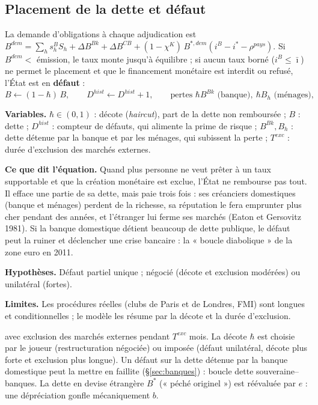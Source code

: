 \documentclass[11pt,a4paper]{article}
\newcommand{\og}{« }
\newcommand{\fg}{ »}
\newcommand{\variables}{\par\noindent\textbf{Variables.} }
\newcommand{\sens}{\par\noindent\textbf{Ce que dit l'équation.} }
\newcommand{\hyp}{\par\noindent\textbf{Hypothèses.} }
\newcommand{\limites}{\par\noindent\textbf{Limites.} }
\begin{document}
\subsection{Placement de la dette et défaut}
La demande d'obligations à chaque adjudication est $B^{dem} = \sum_h s^B_h S_h + \Delta B^{Bk} + \Delta B^{CB} + (1-\chi^K)\,B^{\ast,dem}(i^B - i^\ast - \rho^{pays})$. Si $B^{dem} < $ émission, le taux monte jusqu'à équilibre ; si aucun taux borné ($i^B \le \bar\imath$) ne permet le placement et que le financement monétaire est interdit ou refusé, l'État est en \textbf{défaut} :
\begin{equation}
B \leftarrow (1-\hbar)\,B, \qquad D^{hist} \leftarrow D^{hist} + 1, \qquad \text{pertes } \hbar B^{Bk} \text{ (banque)}, \ \hbar B_h \text{ (ménages)},
\label{eq:default}
\end{equation}
\begin{lecture}
\variables $\hbar\in(0,1)$ : décote (\emph{haircut}), part de la dette non remboursée ; $B$ : dette ; $D^{hist}$ : compteur de défauts, qui alimente la prime de risque ; $B^{Bk}, B_h$ : dette détenue par la banque et par les ménages, qui subissent la perte ; $T^{exc}$ : durée d'exclusion des marchés externes.
\sens Quand plus personne ne veut prêter à un taux supportable et que la création monétaire est exclue, l'État ne rembourse pas tout. Il efface une partie de sa dette, mais paie trois fois : ses créanciers domestiques (banque et ménages) perdent de la richesse, sa réputation le fera emprunter plus cher pendant des années, et l'étranger lui ferme ses marchés (Eaton et Gersovitz 1981). Si la banque domestique détient beaucoup de dette publique, le défaut peut la ruiner et déclencher une crise bancaire : la « boucle diabolique » de la zone euro en 2011.
\hyp Défaut partiel unique ; négocié (décote et exclusion modérées) ou unilatéral (fortes).
\limites Les procédures réelles (clubs de Paris et de Londres, FMI) sont longues et conditionnelles ; le modèle les résume par la décote et la durée d'exclusion.
\end{lecture}
avec exclusion des marchés externes pendant $T^{exc}$ mois.
La décote $\hbar$ est choisie par le joueur (restructuration négociée) ou imposée (défaut unilatéral, décote plus forte et exclusion plus longue). Un défaut sur la dette détenue par la banque domestique peut la mettre en faillite (\S\ref{sec:banques}) : boucle dette souveraine--banques. La dette en devise étrangère $B^\ast$ (\og péché originel\fg) est réévaluée par $e$ : une dépréciation gonfle mécaniquement $b$.
\end{document}
